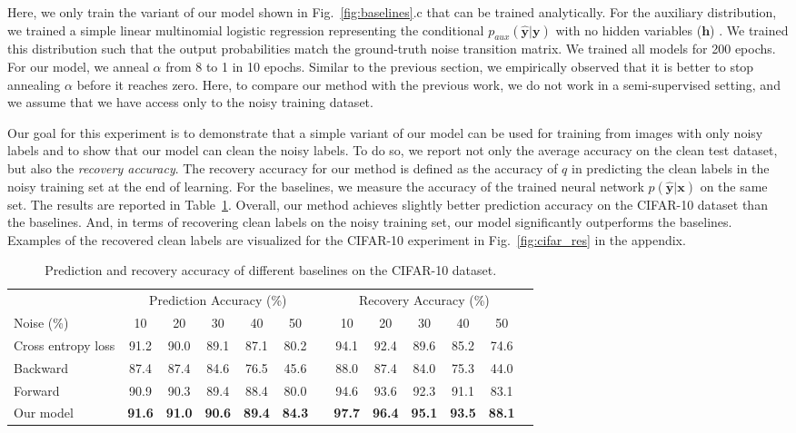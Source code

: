 \documentclass{article}
\newcommand{\x}{{\pmb{x}}}
\newcommand{\y}{{\pmb{y}}}
\newcommand{\yh}{{\hat{\pmb{y}}}}
\newcommand{\h}{{\pmb{h}}}
\begin{document}
Here, we only train the variant of our model shown in Fig.~\ref{fig:baselines}.c that can be trained analytically. For the auxiliary
distribution, we trained a simple linear multinomial logistic regression representing the conditional $p_{aux}(\yh | \y)$ with no hidden variables ($\h$) . 
We trained this distribution such that the output probabilities match the ground-truth noise transition matrix.
We trained all models for 200 epochs. For our model, we anneal
$\alpha$ from 8 to 1 in 10 epochs. Similar to the previous section, we empirically observed that it is better to stop annealing $\alpha$ before it reaches zero.
Here, to compare our method with the previous work, we do not work in a semi-supervised setting, and we assume that we have access only to the noisy training dataset. 

Our goal for this experiment is to demonstrate that
a simple variant of our model can be used for training from images with only noisy labels  and to show that our model can
clean the noisy labels. To do so, we report not only the average accuracy on the clean test dataset, but also the \textit{recovery accuracy}. 
The recovery accuracy for our method is defined as the accuracy of $q$ in predicting the clean labels in the noisy training set at the end of learning. For the baselines,
we measure the accuracy of the trained neural network $p(\yh|\x)$ on the same set.
The results are reported in Table~\ref{table:cifar}.  Overall, our method achieves slightly better prediction accuracy on the CIFAR-10 dataset than the baselines.
And, in terms of recovering clean labels on the noisy training set, our model significantly outperforms the baselines.
Examples of the recovered clean labels are visualized for the CIFAR-10 experiment in Fig.~\ref{fig:cifar_res} in the appendix.

\begin{table}[t]
\caption{Prediction and recovery accuracy of different baselines on the CIFAR-10 dataset.} \label{table:cifar}
\centering
\begin{tabular}{ lcccccccccccc}
\multicolumn{1}{c}{} & \multicolumn{5}{c}{Prediction Accuracy (\%)} && \multicolumn{5}{c}{Recovery Accuracy (\%)} \\
\cline{2-6} \cline{8-12}
Noise (\%)  & 10 & 20 & 30 & 40 & 50 && 10 & 20 & 30 & 40 & 50 \\
\hline
Cross entropy loss  & 91.2 & 90.0 & 89.1 & 87.1 & 80.2          && 94.1 & 92.4 & 89.6 & 85.2 & 74.6 \\
Backward~\cite{patrini2016} & 87.4 & 87.4 & 84.6 & 76.5 & 45.6  && 88.0 & 87.4 & 84.0 & 75.3 & 44.0 \\
Forward~\cite{patrini2016} & 90.9 & 90.3 & 89.4 & 88.4 & 80.0   && 94.6 & 93.6 & 92.3 & 91.1 & 83.1 \\
Our model & \textbf{91.6} & \textbf{91.0} & \textbf{90.6} & \textbf{89.4} &  \textbf{84.3} && \textbf{97.7} & \textbf{96.4} & \textbf{95.1} & \textbf{93.5} & \textbf{88.1} \\
\end{tabular}
\end{table}
\end{document}
